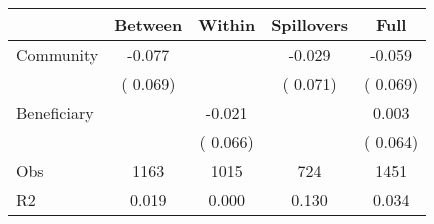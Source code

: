 
\begin{tabular}{l*{4}{c}}\hline&\multicolumn{1}{c}{Between}&\multicolumn{1}{c}{Within}&\multicolumn{1}{c}{Spillovers}&\multicolumn{1}{c}{Full}\\ \hline
 Community             &             -0.077      &                                               &       -0.029 &        -0.059                            \\ 
                               &        (       0.069)           &                                       &       (       0.071)     &      (       0.069)                                           \\ 
 Beneficiary   &                                               &       -0.021    &                                &             0.003                            \\ 
                               &                                               & (       0.066)                  &                                        &      (       0.064)                                           \\ 
\hline                                                                                                                                                                                                                                            
 Obs                   &               1163               &       1015                       &       724                &              1451                                               \\ 
 R2                    &                      0.019              &              0.000                      &              0.130               &                     0.034                                              \\ 
\hline \end{tabular}                                                                                                                                                                                                              
